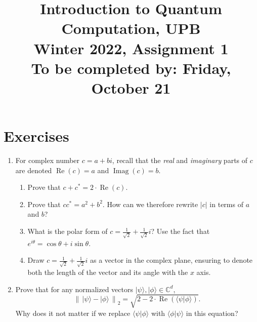 \documentclass{article}
\newcommand{\ket}[1]{|#1\rangle}
\newcommand{\braket}[2]{\langle #1|#2\rangle}
\newcommand{\norm}[1]{\left\|\,#1\,\right\|}       %
\newcommand{\enorm}[1]{\norm{#1}_{\mathrm{2}}}      %
\newcommand{\abs}[1]{\left\lvert #1 \right\rvert}
\newcommand{\complex}{{\mathbb C}}
\begin{document}
\title{\vspace{-10mm}Introduction to Quantum Computation, UPB\\Winter 2022, Assignment 1\\{\large To be completed by: Friday, October 21}}
\date{}
\maketitle

\section{Exercises}
\begin{enumerate}
  \item %
        For complex number $c=a+bi$, recall that the \emph{real} and \emph{imaginary} parts of $c$ are denoted $\operatorname{Re}(c)=a$ and $\operatorname{Imag}(c)=b$.
        \begin{enumerate}
          \item %
                Prove that $c+c^\ast=2\cdot \operatorname{Re}(c)$.
          \item %
                Prove that $cc^\ast={a}^2+{b}^2$. How can we therefore rewrite $\abs{c}$ in terms of $a$ and $b$?
          \item %
                What is the polar form of $c=\frac{1}{\sqrt{2}}+\frac{1}{\sqrt{2}}i$? Use the fact that $e^{i\theta}=\cos\theta+i\sin\theta$.
          \item %
                Draw $c=\frac{1}{\sqrt{2}}+\frac{1}{\sqrt{2}}i$ as a vector in the complex plane, ensuring to denote both the length of the vector and its angle with the $x$ axis.
        \end{enumerate}
  \item %
        Prove that for any normalized vectors $\ket{\psi},\ket{\phi}\in\complex^d$,
        \[
          \enorm{\ket{\psi}-\ket{\phi}}=\sqrt{2-2\cdot\operatorname{Re}(\braket{\psi}{\phi})}.
        \]
        Why does it not matter if we replace $\braket{\psi}{\phi}$ with $\braket{\phi}{\psi}$ in this equation?


\end{enumerate}
\end{document}
